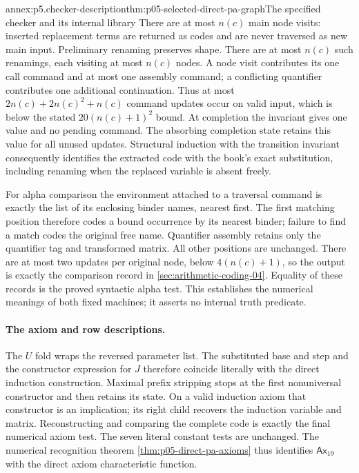 \begin{annexitem}{annex:p5.checker-description}{thm:p05-selected-direct-pa-graph}{The specified checker and its internal library}
There are at most \(n(c)\) main node visits: inserted replacement terms are
returned as codes and are never traversed as new main input.  Preliminary
renaming preserves shape.  There are at most \(n(c)\) such renamings, each
visiting at most \(n(c)\) nodes.  A node visit contributes its one call
command and at most one assembly command; a conflicting quantifier contributes
one additional continuation.  Thus at most
\(2n(c)+2n(c)^2+n(c)\) command updates occur on valid input, which is below
the stated \(20(n(c)+1)^2\) bound.  At completion the invariant gives one
value and no pending command.  The absorbing completion state retains this
value for all unused updates.  Structural induction with the transition
invariant consequently identifies the extracted code with the book's exact
substitution, including renaming when the replaced variable is absent freely.

For alpha comparison the environment attached to a traversal command is
exactly the list of its enclosing binder names, nearest first.  The first
matching position therefore codes a bound occurrence by its nearest binder;
failure to find a match codes the original free name.  Quantifier assembly
retains only the quantifier tag and transformed matrix.  All other positions
are unchanged.  There are at most two updates per original node, below
\(4(n(c)+1)\), so the output is exactly the comparison record in
\cref{sec:arithmetic-coding-04}.  Equality of these records is the proved
syntactic alpha test.  This establishes the numerical meanings of both fixed
machines; it asserts no internal truth predicate.

\paragraph{The axiom and row descriptions.}
The \(U\) fold wraps the reversed parameter list.  The substituted base and
step and the constructor expression for \(J\) therefore coincide literally
with the direct induction construction.  Maximal prefix stripping stops at
the first nonuniversal constructor and then retains its state.  On a valid
induction axiom that constructor is an implication; its right child recovers
the induction variable and matrix.  Reconstructing and comparing the complete
code is exactly the final numerical axiom test.  The seven literal constant
tests are unchanged.  The numerical recognition theorem
\cref{thm:p05-direct-pa-axioms} thus identifies \(\mathsf{Ax}_{19}\) with
the direct axiom characteristic function.


\end{annexitem}
